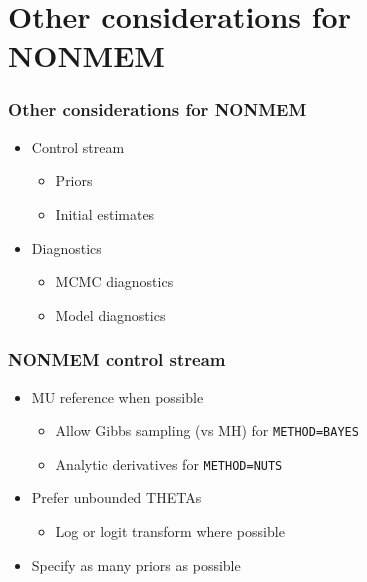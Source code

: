 \documentclass[handout]{beamer}
\begin{document}


\section{Other considerations for NONMEM}

\begin{frame}
  \frametitle{Other considerations for NONMEM}

  \begin{itemize}
  \item Control stream
    \begin{itemize}
      \item Priors
      \item Initial estimates
    \end{itemize}
  \item Diagnostics
    \begin{itemize}
      \item MCMC diagnostics
      \item Model diagnostics
    \end{itemize}
  \end{itemize}

\end{frame}

\begin{frame}[fragile]
  \frametitle{NONMEM control stream}

\begin{itemize}
  \item MU reference when possible
        \begin{itemize}
          \item Allow Gibbs sampling (vs MH) for \verb|METHOD=BAYES|
          \item Analytic derivatives for \verb|METHOD=NUTS|
        \end{itemize}
  \item Prefer unbounded THETAs
        \begin{itemize}
          \item Log or logit transform where possible
        \end{itemize}
  \item Specify as many priors as possible
\end{itemize}

\end{frame}
\end{document}

